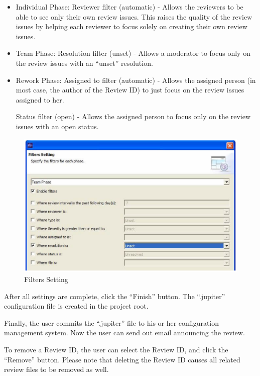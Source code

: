 \begin{itemize}
	\item Individual Phase: Reviewer filter (automatic) - Allows the reviewers to be able to see only their own review issues. This raises the quality of the review issues by helping each reviewer to focus solely on creating their own review issues.
	\item Team Phase: Resolution filter (unset) - Allows a moderator to focus only on the review issues with an ``unset'' resolution.
	\item Rework Phase: Assigned to filter (automatic) - Allows the assigned person (in most case, the author of the Review ID) to just focus on the review issues assigned to her.

Status filter (open) - Allows the assigned person to focus only on the review issues with an open status.
\end{itemize}

\begin{figure}[htbp]
  \centering
  \includegraphics{images/fig3-11.eps}
  \caption{Filters Setting}
  \label{fig3-11}
\end{figure}

After all settings are complete, click the ``Finish'' button. The ``.jupiter'' configuration file is created in the project root.

Finally, the user commits the ``.jupiter'' file to his or her configuration management system. Now the user can send out email announcing the review.

To remove a Review ID, the user can select the Review ID, and click the ``Remove'' button. Please note that deleting the Review ID causes all related review files to be removed as well.

